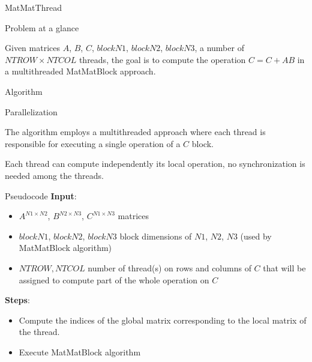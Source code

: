 \begin{chapter}{MatMatThread}
    \begin{section}{Problem at a glance}
        \par Given matrices $A$, $B$, $C$, $blockN1$, $blockN2$, $blockN3$, a number of $NTROW \times NTCOL$ threads, the goal is to compute the  operation $C = C + AB$ in a multithreaded MatMatBlock approach.
    \end{section}
    \begin{section}{Algorithm}
        \begin{subsection}{Parallelization}
            \par The algorithm employs a multithreaded approach where each thread is responsible for executing a single  operation of a $C$ block.
            \par Each thread can compute independently its local  operation, no synchronization is needed among the threads.
        \end{subsection}
        \begin{subsection}{Pseudocode}
            \textbf{Input}:
            \begin{itemize}
                \item $A^{N1 \times N2}$, $B^{N2 \times N3}$, $C^{N1 \times N3}$ matrices
                \item $blockN1$, $blockN2$, $blockN3$ block dimensions of $N1$, $N2$, $N3$ (used by MatMatBlock algorithm)
                \item $NTROW, NTCOL$ number of thread(s) on rows and columns of $C$ that will be assigned to compute part of the whole  operation on $C$
            \end{itemize}
            \textbf{Steps}:
            \begin{itemize}
                \item Compute the indices of the global matrix corresponding to the local matrix of the thread.
                \item Execute MatMatBlock algorithm
            \end{itemize}
            
        \end{subsection}
        \begin{figure}[ht]
            \centering
            
            \label{fig:matmatthread}
        \end{figure}

\end{section}
\end{chapter}
